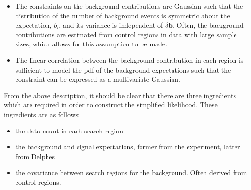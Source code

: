 \begin{itemize}
\item{The constraints on the background contributions are Gaussian such that the distribution of the number of background events is symmetric about the expectation, $b_{i}$, 
and its variance is independent of $\delta \mathbf{b}$. Often, the background contributions are estimated from control regions in data with large sample sizes, which allows for this 
assumption to be made.}

\item{The linear correlation between the background contribution in each region is sufficient to model the  pdf of the background expectations such that the constraint 
can be expressed as a multivariate Gaussian.}
\end{itemize}


From the above description, it should be clear that there are three ingredients which are 
required in order to construct the simplified likelihood. These ingredients are as follows; 

\begin{itemize}
\item {the data count in each search region}
\item {the background and signal expectations, former from the experiment, latter from Delphes}
\item {the covariance between search regions for the background. Often derived from control regions.}
\end{itemize}



